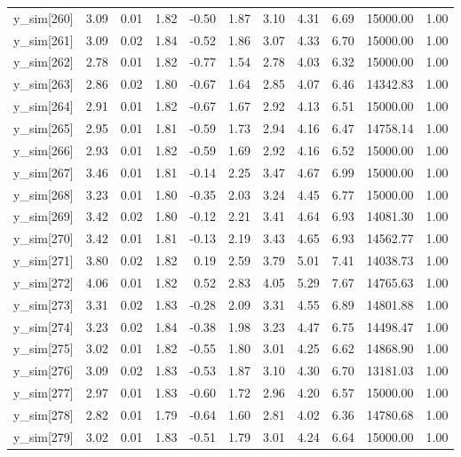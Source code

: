 \begin{table}[ht]
\begin{tabular}{rrrrrrrrrrr}
  y\_sim[260] & 3.09 & 0.01 & 1.82 & -0.50 & 1.87 & 3.10 & 4.31 & 6.69 & 15000.00 & 1.00 \\ 
  y\_sim[261] & 3.09 & 0.02 & 1.84 & -0.52 & 1.86 & 3.07 & 4.33 & 6.70 & 15000.00 & 1.00 \\ 
  y\_sim[262] & 2.78 & 0.01 & 1.82 & -0.77 & 1.54 & 2.78 & 4.03 & 6.32 & 15000.00 & 1.00 \\ 
  y\_sim[263] & 2.86 & 0.02 & 1.80 & -0.67 & 1.64 & 2.85 & 4.07 & 6.46 & 14342.83 & 1.00 \\ 
  y\_sim[264] & 2.91 & 0.01 & 1.82 & -0.67 & 1.67 & 2.92 & 4.13 & 6.51 & 15000.00 & 1.00 \\ 
  y\_sim[265] & 2.95 & 0.01 & 1.81 & -0.59 & 1.73 & 2.94 & 4.16 & 6.47 & 14758.14 & 1.00 \\ 
  y\_sim[266] & 2.93 & 0.01 & 1.82 & -0.59 & 1.69 & 2.92 & 4.16 & 6.52 & 15000.00 & 1.00 \\ 
  y\_sim[267] & 3.46 & 0.01 & 1.81 & -0.14 & 2.25 & 3.47 & 4.67 & 6.99 & 15000.00 & 1.00 \\ 
  y\_sim[268] & 3.23 & 0.01 & 1.80 & -0.35 & 2.03 & 3.24 & 4.45 & 6.77 & 15000.00 & 1.00 \\ 
  y\_sim[269] & 3.42 & 0.02 & 1.80 & -0.12 & 2.21 & 3.41 & 4.64 & 6.93 & 14081.30 & 1.00 \\ 
  y\_sim[270] & 3.42 & 0.01 & 1.81 & -0.13 & 2.19 & 3.43 & 4.65 & 6.93 & 14562.77 & 1.00 \\ 
  y\_sim[271] & 3.80 & 0.02 & 1.82 & 0.19 & 2.59 & 3.79 & 5.01 & 7.41 & 14038.73 & 1.00 \\ 
  y\_sim[272] & 4.06 & 0.01 & 1.82 & 0.52 & 2.83 & 4.05 & 5.29 & 7.67 & 14765.63 & 1.00 \\ 
  y\_sim[273] & 3.31 & 0.02 & 1.83 & -0.28 & 2.09 & 3.31 & 4.55 & 6.89 & 14801.88 & 1.00 \\ 
  y\_sim[274] & 3.23 & 0.02 & 1.84 & -0.38 & 1.98 & 3.23 & 4.47 & 6.75 & 14498.47 & 1.00 \\ 
  y\_sim[275] & 3.02 & 0.01 & 1.82 & -0.55 & 1.80 & 3.01 & 4.25 & 6.62 & 14868.90 & 1.00 \\ 
  y\_sim[276] & 3.09 & 0.02 & 1.83 & -0.53 & 1.87 & 3.10 & 4.30 & 6.70 & 13181.03 & 1.00 \\ 
  y\_sim[277] & 2.97 & 0.01 & 1.83 & -0.60 & 1.72 & 2.96 & 4.20 & 6.57 & 15000.00 & 1.00 \\ 
  y\_sim[278] & 2.82 & 0.01 & 1.79 & -0.64 & 1.60 & 2.81 & 4.02 & 6.36 & 14780.68 & 1.00 \\ 
  y\_sim[279] & 3.02 & 0.01 & 1.83 & -0.51 & 1.79 & 3.01 & 4.24 & 6.64 & 15000.00 & 1.00 \\ 

\end{tabular}
\end{table}
